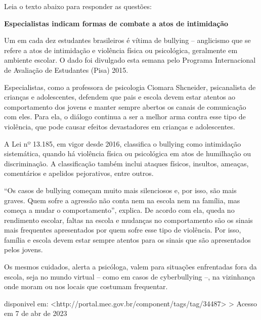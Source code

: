 {


Leia o texto abaixo para responder as questões:

\textbf{Especialistas indicam formas de combate a atos de intimidação}

Um em cada dez estudantes brasileiros é vítima de bullying -- anglicismo
que se refere a atos de intimidação e violência física ou psicológica,
geralmente em ambiente escolar. O dado foi divulgado esta semana pelo
Programa Internacional de Avaliação de Estudantes (Pisa) 2015.

Especialistas, como a professora de psicologia Ciomara Shcneider,
psicanalista de crianças e adolescentes, defendem que pais e escola
devem estar atentos ao comportamento dos jovens e manter sempre abertos
os canais de comunicação com eles. Para ela, o diálogo continua a ser a
melhor arma contra esse tipo de violência, que pode causar efeitos
devastadores em crianças e adolescentes.

A Lei nº 13.185, em vigor desde 2016, classifica o bullying como
intimidação sistemática, quando há violência física ou psicológica em
atos de humilhação ou discriminação. A classificação também inclui
ataques físicos, insultos, ameaças, comentários e apelidos pejorativos,
entre outros.

``Os casos de bullying começam muito mais silenciosos e, por isso, são
mais graves. Quem sofre a agressão não conta nem na escola nem na
família, mas começa a mudar o comportamento'', explica. De acordo com
ela, queda no rendimento escolar, faltas na escola e mudanças no
comportamento são os sinais mais frequentes apresentados por quem sofre
esse tipo de violência. Por isso, família e escola devem estar sempre
atentos para os sinais que são apresentados pelos jovens.

Os mesmos cuidados, alerta a psicóloga, valem para situações enfrentadas
fora da escola, seja no mundo virtual -- como em casos de cyberbullying
--, na vizinhança onde moram ou nos locais que costumam frequentar.

disponivel em:
\textless http://portal.mec.gov.br/component/tags/tag/34487\textgreater{}
\textgreater{} Acesso em 7 de abr de 2023

}
